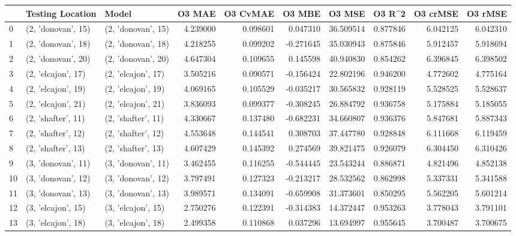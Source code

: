 \begin{tabular}{lllrrrrrrr}
\toprule
{} &    Testing Location &               Model &    O3 MAE &  O3 CvMAE &    O3 MBE &     O3 MSE &    O3 R\textasciicircum2 &  O3 crMSE &   O3 rMSE \\
\midrule
0  &  (2, 'donovan', 15) &  (2, 'donovan', 15) &  4.239000 &  0.098601 &  0.047310 &  36.509514 &  0.877846 &  6.042125 &  6.042310 \\
1  &  (2, 'donovan', 18) &  (2, 'donovan', 18) &  4.218255 &  0.099202 & -0.271645 &  35.030943 &  0.875846 &  5.912457 &  5.918694 \\
2  &  (2, 'donovan', 20) &  (2, 'donovan', 20) &  4.647304 &  0.109655 &  0.145598 &  40.940830 &  0.854262 &  6.396845 &  6.398502 \\
3  &  (2, 'elcajon', 17) &  (2, 'elcajon', 17) &  3.505216 &  0.090571 & -0.156424 &  22.802196 &  0.946200 &  4.772602 &  4.775164 \\
4  &  (2, 'elcajon', 19) &  (2, 'elcajon', 19) &  4.069165 &  0.105529 & -0.035217 &  30.565832 &  0.928119 &  5.528525 &  5.528637 \\
5  &  (2, 'elcajon', 21) &  (2, 'elcajon', 21) &  3.836093 &  0.099377 & -0.308245 &  26.884792 &  0.936758 &  5.175884 &  5.185055 \\
6  &  (2, 'shafter', 11) &  (2, 'shafter', 11) &  4.330667 &  0.137480 & -0.682231 &  34.660807 &  0.936376 &  5.847681 &  5.887343 \\
7  &  (2, 'shafter', 12) &  (2, 'shafter', 12) &  4.553648 &  0.144541 &  0.308703 &  37.447780 &  0.928848 &  6.111668 &  6.119459 \\
8  &  (2, 'shafter', 13) &  (2, 'shafter', 13) &  4.607429 &  0.145392 &  0.274569 &  39.821475 &  0.926079 &  6.304450 &  6.310426 \\
9  &  (3, 'donovan', 11) &  (3, 'donovan', 11) &  3.462455 &  0.116255 & -0.544445 &  23.543244 &  0.886871 &  4.821496 &  4.852138 \\
10 &  (3, 'donovan', 12) &  (3, 'donovan', 12) &  3.797491 &  0.127323 & -0.213217 &  28.532562 &  0.862998 &  5.337331 &  5.341588 \\
11 &  (3, 'donovan', 13) &  (3, 'donovan', 13) &  3.989571 &  0.134091 & -0.659908 &  31.373601 &  0.850295 &  5.562205 &  5.601214 \\
12 &  (3, 'elcajon', 15) &  (3, 'elcajon', 15) &  2.750276 &  0.122391 & -0.314383 &  14.372447 &  0.953263 &  3.778043 &  3.791101 \\
13 &  (3, 'elcajon', 18) &  (3, 'elcajon', 18) &  2.499358 &  0.110868 &  0.037296 &  13.694997 &  0.955645 &  3.700487 &  3.700675 \\

\end{tabular}
